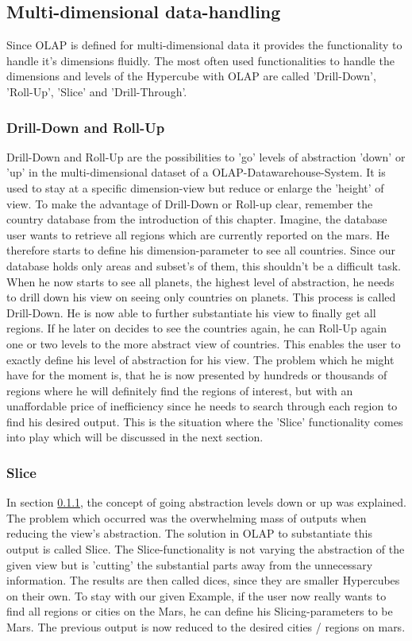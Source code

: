 \documentclass[12pt,a4paper,oneside,
liststotoc, 					%
bibtotoc,						%
titlepage, 						%
headsepline, 					%
BCOR6mm,						%
openany,							%
]{scrreprt}
\begin{document}
\subsection{Multi-dimensional data-handling}\label{multdimhandling}
Since OLAP is defined for multi-dimensional data it provides the functionality to handle it's dimensions fluidly. The most often used functionalities to handle the dimensions and levels of the Hypercube with OLAP are called 'Drill-Down', 'Roll-Up', 'Slice' and 'Drill-Through'.
\subsubsection{Drill-Down and Roll-Up}\label{drru}
Drill-Down and Roll-Up are the possibilities to 'go' levels of abstraction 'down' or 'up' in the multi-dimensional dataset of a OLAP-Datawarehouse-System. It is used to stay at a specific dimension-view but reduce or enlarge the 'height' of view. To make the advantage of Drill-Down or Roll-up clear, remember the country database from the introduction of this chapter. Imagine, the database user wants to retrieve all regions which are currently reported on the mars. He therefore starts to define his dimension-parameter to see all countries. Since our database holds only areas and subset's of them, this shouldn't be a difficult task. When he now starts to see all planets, the highest level of abstraction, he needs to drill down his view on seeing only countries on planets. This process is called Drill-Down. He is now able to further substantiate his view to finally get all regions. If he later on decides to see the countries again, he can Roll-Up again one or two levels to the more abstract view of countries. This enables the user to exactly define his level of abstraction for his view. The problem which he might have for the moment is, that he is now presented by hundreds or thousands of regions where he will definitely find the regions of interest, but with an unaffordable price of inefficiency since he needs to search through each region to find his desired output. This is the situation where the 'Slice' functionality comes into play which will be discussed in the next section.
\subsubsection{Slice}\label{slice}
In section \ref{drru}, the concept of going abstraction levels down or up was explained. The problem which occurred was the overwhelming mass of outputs when reducing the view's abstraction. The solution in OLAP to substantiate this output is called Slice. The Slice-functionality is not varying the abstraction of the given view but is 'cutting' the substantial parts away from the unnecessary information. The results are then called dices, since they are smaller Hypercubes on their own. To stay with our given Example, if the user now really wants to find all regions or cities on the Mars, he can define his Slicing-parameters to be Mars. The previous output is now reduced to the desired cities / regions on mars.
\end{document}
